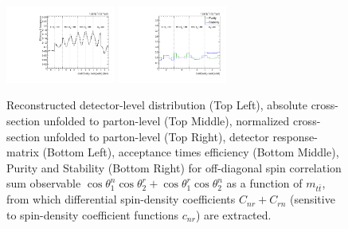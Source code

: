 \begin{figure}[htb]
\begin{center}
 \includegraphics[width=0.32\textwidth]{fig_fullRun2UL/unfolding/combined/TotEff_c_Pnr_mttbar.pdf}
 \includegraphics[width=0.32\textwidth]{fig_fullRun2UL/unfolding/combined/PurStab_c_Pnr_mttbar.pdf} \\
\caption{Reconstructed detector-level distribution (Top Left), absolute cross-section unfolded to parton-level (Top Middle), normalized cross-section unfolded to parton-level (Top Right), detector response-matrix (Bottom Left), acceptance times efficiency (Bottom Middle), Purity and Stability (Bottom Right) for off-diagonal spin correlation sum observable $\cos\theta_{1}^{n}\cos\theta_{2}^{r}+\cos\theta_{1}^{r}\cos\theta_{2}^{n}$ as a function of $m_{t\bar{t}}$, from which differential spin-density coefficients $C_{nr}+C_{rn}$ (sensitive to spin-density coefficient functions $c_{n r}$) are extracted.}
\label{fig:c_Pnr_mttbar}
\end{center}
\end{figure}
\clearpage
